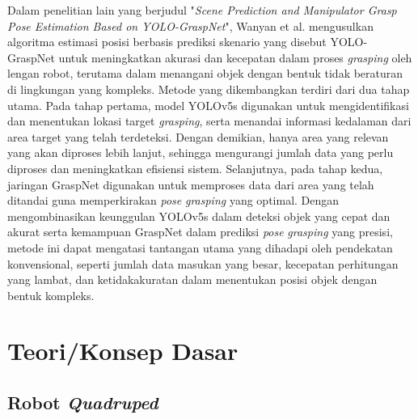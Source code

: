 Dalam penelitian lain yang berjudul "\emph{Scene Prediction and Manipulator Grasp Pose
Estimation Based on YOLO-GraspNet}"\parencite{LiWanyan_spamgpeboyg}, Wanyan et al. mengusulkan
algoritma estimasi posisi berbasis prediksi skenario yang disebut YOLO-GraspNet untuk
meningkatkan akurasi dan kecepatan dalam proses \emph{grasping} oleh lengan robot, terutama dalam
menangani objek dengan bentuk tidak beraturan di lingkungan yang kompleks.
Metode yang dikembangkan terdiri dari dua tahap utama. Pada tahap pertama, model YOLOv5s
digunakan untuk mengidentifikasi dan menentukan lokasi target \emph{grasping}, serta menandai informasi
kedalaman dari area target yang telah terdeteksi. Dengan demikian, hanya area yang relevan
yang akan diproses lebih lanjut, sehingga mengurangi jumlah data yang perlu diproses dan
meningkatkan efisiensi sistem. Selanjutnya, pada tahap kedua, jaringan GraspNet digunakan
untuk memproses data dari area yang telah ditandai guna memperkirakan \emph{pose} \emph{grasping} yang optimal.
Dengan mengombinasikan keunggulan YOLOv5s dalam deteksi objek yang cepat dan akurat serta
kemampuan GraspNet dalam prediksi \emph{pose} \emph{grasping} yang presisi, metode ini dapat mengatasi
tantangan utama yang dihadapi oleh pendekatan konvensional, seperti jumlah data masukan yang besar,
kecepatan perhitungan yang lambat, dan ketidakakuratan dalam menentukan posisi objek dengan bentuk kompleks.

\section{Teori/Konsep Dasar}



\subsection{Robot \emph{Quadruped}}

